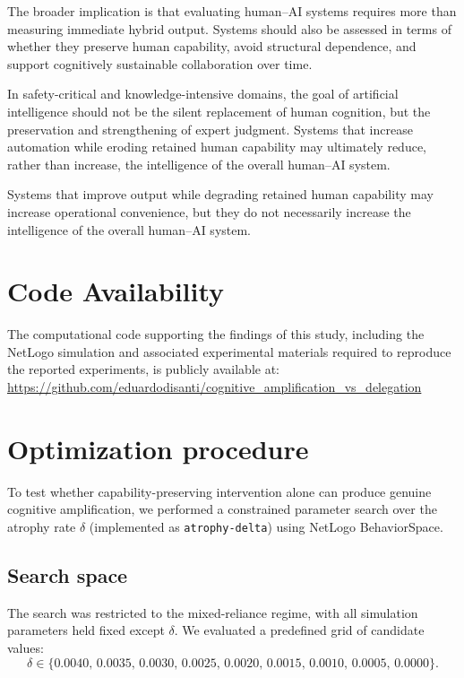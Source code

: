 \documentclass[11pt,a4paper]{article}
\begin{document}
The broader implication is that evaluating human--AI systems requires more than measuring immediate hybrid output. Systems should also be assessed in terms of whether they preserve human capability, avoid structural dependence, and support cognitively sustainable collaboration over time.

In safety-critical and knowledge-intensive domains, the goal of artificial intelligence should not be the silent replacement of human cognition, but the preservation and strengthening of expert judgment. Systems that increase automation while eroding retained human capability may ultimately reduce, rather than increase, the intelligence of the overall human--AI system.

Systems that improve output while degrading retained human capability may increase operational convenience, but they do not necessarily increase the intelligence of the overall human--AI system.

\section*{Code Availability}
The computational code supporting the findings of this study, including the NetLogo simulation and associated experimental materials required to reproduce the reported experiments, is publicly available at:
\url{https://github.com/eduardodisanti/cognitive_amplification_vs_delegation}




\appendix

\section{Optimization procedure}
\label{app:optimization}

To test whether capability-preserving intervention alone can produce genuine cognitive amplification, we performed a constrained parameter search over the atrophy rate $\delta$ (implemented as \texttt{atrophy-delta}) using NetLogo BehaviorSpace.

\subsection{Search space}

The search was restricted to the mixed-reliance regime, with all simulation parameters held fixed except $\delta$. We evaluated a predefined grid of candidate values:
    \[
\delta \in \{0.0040,\,0.0035,\,0.0030,\,0.0025,\,0.0020,\,0.0015,\,0.0010,\,0.0005,\,0.0000\}.
\]
\end{document}
